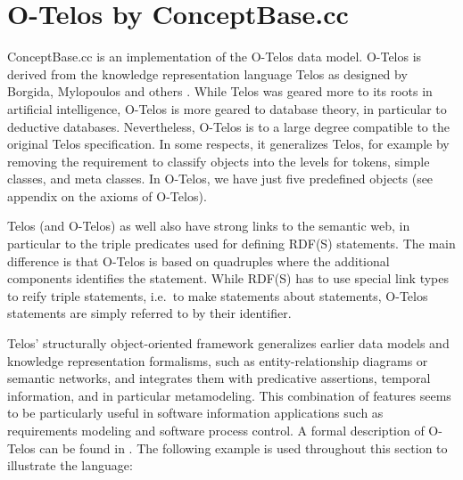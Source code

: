 
\def\Isa{\hbox{\it Isa}}
\def\In{\hbox{\it In}}
\def\IN{\hbox{\it IN}}
\def\ID{\hbox{\rm ID}}
\def\AL{\hbox{\rm AL}}
\def\OB{\hbox{\rm OB}}
\def\LABEL{\hbox{\rm LABEL}}

\chapter{O-Telos by ConceptBase.cc}
\label{cap:language}

ConceptBase.cc is an implementation of the O-Telos data model.
O-Telos is derived from the knowledge representation language Telos as
designed by Borgida, Mylopoulos and others \cite{mbjk90}.
While Telos was geared more to its roots in artificial intelligence, O-Telos
is more geared to database theory, in particular to deductive databases.
Nevertheless, O-Telos is to a large degree compatible to the original
Telos specification. In some respects, it generalizes Telos, for example by
removing the requirement to classify objects into the levels for
tokens, simple classes, and meta classes.
In O-Telos, we have just five predefined objects (see appendix
on the axioms of O-Telos).

Telos (and O-Telos) as well also have strong links to the semantic web, in
particular to the triple predicates used for defining RDF(S) statements. The main
difference is that O-Telos is based on quadruples where the additional
components identifies the statement. While RDF(S) has to use special link
types to reify triple statements, i.e.\ to make statements about statements,
O-Telos statements are simply referred to by their identifier. 

Telos' structurally object-oriented framework generalizes earlier data
models and knowledge representation formalisms, such as entity-relationship
diagrams or semantic networks, and integrates them with predicative
assertions, temporal information, and in particular metamodeling.
This combination of features seems to
be particularly useful in software information applications such as
requirements modeling and software process control. A formal description of
O-Telos can be found in \cite{mbjk90,jeus92}. The following example is used
throughout this section to illustrate the language:


